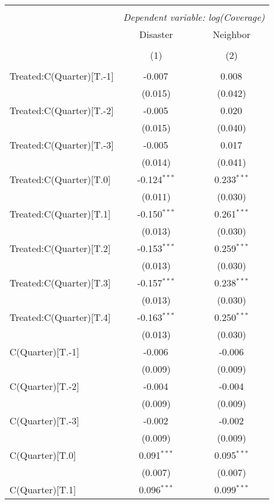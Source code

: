 
\begin{tabular}{@{\extracolsep{5pt}}lcc}
\\[-1.8ex]\hline
\hline \\[-1.8ex]
& \multicolumn{2}{c}{\textit{Dependent variable: log(Coverage)}} \
\cr \cline{2-3}
\\[-1.8ex] & \multicolumn{1}{c}{Disaster} & \multicolumn{1}{c}{Neighbor}  \\
\\[-1.8ex] & (1) & (2) \\
\hline \\[-1.8ex]
 Treated:C(Quarter)[T.-1] & -0.007$^{}$ & 0.008$^{}$ \\
& (0.015) & (0.042) \\
 Treated:C(Quarter)[T.-2] & -0.005$^{}$ & 0.020$^{}$ \\
& (0.015) & (0.040) \\
 Treated:C(Quarter)[T.-3] & -0.005$^{}$ & 0.017$^{}$ \\
& (0.014) & (0.041) \\
 Treated:C(Quarter)[T.0] & -0.124$^{***}$ & 0.233$^{***}$ \\
& (0.011) & (0.030) \\
 Treated:C(Quarter)[T.1] & -0.150$^{***}$ & 0.261$^{***}$ \\
& (0.013) & (0.030) \\
 Treated:C(Quarter)[T.2] & -0.153$^{***}$ & 0.259$^{***}$ \\
& (0.013) & (0.030) \\
 Treated:C(Quarter)[T.3] & -0.157$^{***}$ & 0.238$^{***}$ \\
& (0.013) & (0.030) \\
 Treated:C(Quarter)[T.4] & -0.163$^{***}$ & 0.250$^{***}$ \\
& (0.013) & (0.030) \\
C(Quarter)[T.-1] & -0.006$^{}$ & -0.006$^{}$ \\
& (0.009) & (0.009) \\
 C(Quarter)[T.-2] & -0.004$^{}$ & -0.004$^{}$ \\
& (0.009) & (0.009) \\
 C(Quarter)[T.-3] & -0.002$^{}$ & -0.002$^{}$ \\
& (0.009) & (0.009) \\
 C(Quarter)[T.0] & 0.091$^{***}$ & 0.095$^{***}$ \\
& (0.007) & (0.007) \\
 C(Quarter)[T.1] & 0.096$^{***}$ & 0.099$^{***}$ \\

\end{tabular}
